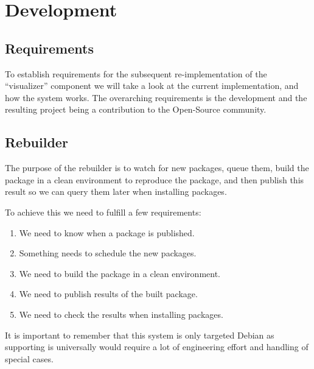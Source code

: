 \documentclass[../Main/thesis.tex]{subfiles}
\begin{document}
\chapter{Development}\label{ch:development}

\section{Requirements}%
\label{sec:requirements}
To establish requirements for the subsequent re-implementation of the
``visualizer'' component we will take a look at the current implementation, and
how the system works. The overarching requirements is the development and the
resulting project being a contribution to the Open-Source community.

\section{Rebuilder}\label{sec:development_rebuilders}
The purpose of the rebuilder is to watch for new packages, queue them, build the
package in a clean environment to reproduce the package, and then publish this
result so we can query them later when installing packages.

To achieve this we need to fulfill a few requirements:

\begin{enumerate}
    \item \label{itm:published} We need to know when a package is published.
    \item \label{itm:scheduler} Something needs to schedule the new packages.
    \item \label{itm:builder} We need to build the package in a clean environment.
    \item \label{itm:publish} We need to publish results of the built package.
    \item \label{itm:transport} We need to check the results when installing packages.
\end{enumerate}

It is important to remember that this system is only targeted Debian as
supporting is universally would require a lot of engineering effort and handling
of special cases.
\end{document}
